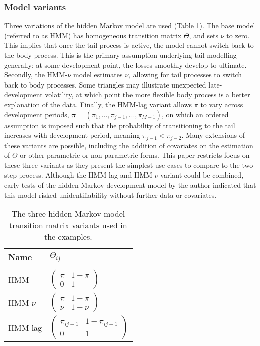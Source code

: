 \subsubsection{Model variants}
Three variations of the hidden Markov model are used (Table \ref{table:variants}). 
The base model (referred to as HMM) has homogeneous transition matrix $\Theta$,
and sets $\nu$ to zero. This implies that once the tail
process is active, the model cannot switch back to the
body process. This is the primary assumption underlying
tail modelling generally: at some development point, the 
losses smoothly develop to ultimate. Secondly, the HMM-$\nu$
model estimates $\nu$, allowing for tail processes to switch
back to body processes. Some triangles may illustrate
unexpected late-development volatility, at which point
the more flexible body process is a better explanation
of the data. Finally, the HMM-lag variant allows $\pi$
to vary across development periods, $\bm{\pi} = (\pi_{1}, 
..., \pi_{j - 1}, ..., \pi_{M - 1})$, on which 
an ordered assumption is imposed such that the probability
of transitioning to the tail increases with development period,
meaning $\pi_{j - 1} < \pi_{j - 2}$.
Many extensions of these variants are possible, including
the addition of covariates on the estimation of
$\Theta$ or other parametric or non-parametric
forms. This paper restricts focus on these three
variants as they present the simplest use cases
to compare to the two-step process. Although
the HMM-lag and HMM-$\nu$ variant could be combined,
early tests of the hidden Markov development model
by the author indicated that this model risked unidentifiability
without further data or covariates.

\begin{table}
    \centering
    \begin{tabular}{p{3cm}|p{3cm}}
        Name & $\Theta_{ij}$ \\
        \hline\\
        HMM & $\begin{pmatrix} \pi & 1 - \pi \\ 0 & 1 \end{pmatrix}$ \\
        HMM-$\nu$ & $\begin{pmatrix} \pi & 1 - \pi \\ \nu & 1 - \nu \end{pmatrix}$\\
        HMM-lag & $\begin{pmatrix} \pi_{ij-1} & 1 - \pi_{ij-1} \\ 0 & 1 \end{pmatrix}$\\
    \end{tabular}
    \caption{
        The three hidden Markov model transition matrix variants
        used in the examples.
    }
    \label{table:variants}
\end{table}


